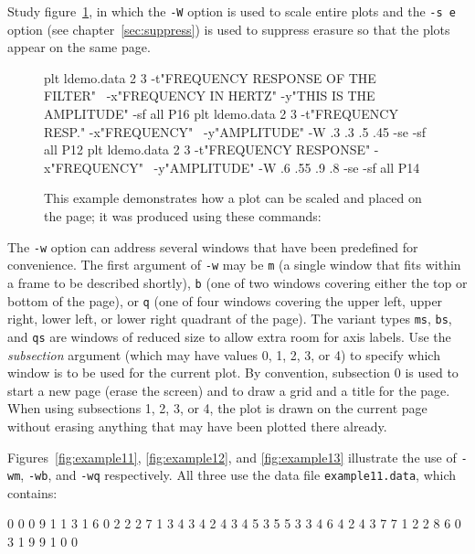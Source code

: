 \documentclass{book}
\begin{document}
Study figure~\ref{fig:example16}, in which the {\tt -W} option is used to scale
entire plots and the {\tt -s e} option (see chapter~\ref{sec:suppress}) is
used to suppress erasure so that the plots appear on the same page.

\begin{figure}
\begin{center}
\end{center}
\caption[Scaling and placement]{This example demonstrates how a plot can be
scaled and placed on the page; it was produced using these commands:
\label{fig:example16}}
\begin{center}
\begin{boxedverbatim}
plt ldemo.data 2 3 -t"FREQUENCY RESPONSE OF THE FILTER" \
 -x"FREQUENCY IN HERTZ" -y"THIS IS THE AMPLITUDE" -sf all P16
plt ldemo.data 2 3 -t"FREQUENCY RESP." -x"FREQUENCY" \
 -y"AMPLITUDE"  -W .3 .3 .5 .45 -se -sf all P12
plt ldemo.data 2 3 -t"FREQUENCY RESPONSE" -x"FREQUENCY" \
 -y"AMPLITUDE"  -W .6 .55 .9 .8 -se -sf all P14
\end{boxedverbatim}
\end{center}
\end{figure}

The {\tt -w} option can address several windows that have been
predefined for convenience.  The first argument of {\tt -w} may be
{\tt m} (a single window that fits within a frame to be described
shortly), {\tt b} (one of two windows covering either the top or
bottom of the page), or {\tt q} (one of four windows covering the
upper left, upper right, lower left, or lower right quadrant of the
page).  The variant types {\tt ms}, {\tt bs}, and {\tt qs} are windows
of reduced size to allow extra room for axis labels.  Use the {\em
subsection} argument (which may have values 0, 1, 2, 3, or 4) to
specify which window is to be used for the current plot.  By
convention, subsection 0 is used to start a new page (erase the
screen) and to draw a grid and a title for the page.  When using
subsections 1, 2, 3, or 4, the plot is drawn on the current page
without erasing anything that may have been plotted there already.

Figures~\ref{fig:example11}, \ref{fig:example12}, and \ref{fig:example13}
illustrate the use of {\tt -wm}, {\tt -wb}, and {\tt -wq} respectively.  All
three use the data file {\tt example11.data}, which contains:
\begin{center}
\begin{boxedverbatim}
0 0 0 9 1
1 3 1 6 0
2 2 2 7 1
3 4 3 4 2
4 3 4 5 3
5 5 3 3 4
6 4 2 4 3
7 7 1 2 2
8 6 0 3 1
9 9 1 0 0
\end{boxedverbatim}
\end{center}
\end{document}
